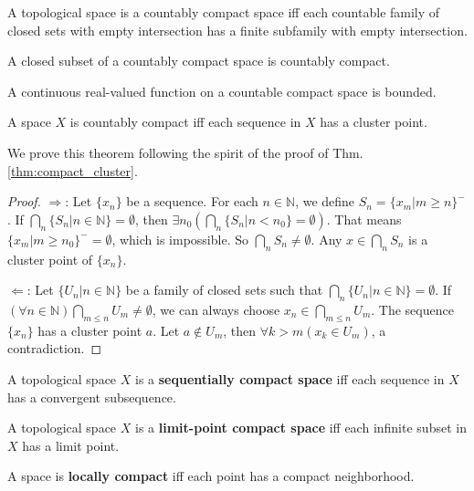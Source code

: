 \documentclass[12pt]{book}
\begin{document}
\begin{lemma}
	A topological space is a countably compact space iff each countable family of closed sets with empty intersection has a finite subfamily with empty intersection. 
\end{lemma}

\begin{theorem}
	A closed subset of a countably compact space is countably compact.
\end{theorem}

\begin{theorem}
	A continuous real-valued function on a countable compact space is bounded.
\end{theorem}

\begin{theorem}
	A space $X$ is countably compact iff each sequence in $X$ has a cluster point.
\end{theorem}
We prove this theorem following the spirit of the proof of Thm. \ref{thm:compact_cluster}.
\begin{proof}
	$\Rightarrow$: Let $\{x_n\}$ be a sequence. For each $n\in\mathbb N$, we define $S_n=\{x_m|m\geq n\}^-$. If $\bigcap_n\{S_n|n\in\mathbb N\}=\emptyset$, then $\exists n_0(\bigcap_n\{S_n|n<n_0\}=\emptyset)$. That means $\{x_m|m\geq n_0\}^-=\emptyset$, which is impossible. So $\bigcap_n S_n\neq \emptyset$. Any $x\in \bigcap_n S_n$ is a cluster point of $\{x_n\}$.
	
	$\Leftarrow$: Let $\{U_n|n\in \mathbb N\}$ be a family of closed sets such that  $\bigcap_n\{U_n|n\in\mathbb N\}=\emptyset$. If $(\forall n\in\mathbb N) \bigcap_{m\leq n}U_m\neq\emptyset$, we can always choose $x_n\in \bigcap_{m\leq n}U_m$. The sequence $\{x_n\}$ has a cluster point $a$. Let $a\not\in U_m$, then $\forall k>m(x_k\in U_m)$, a contradiction.
\end{proof}

\begin{definition}
	A topological space $X$ is a {\bf sequentially compact space} iff each sequence in $X$ has a convergent subsequence.
\end{definition}

\begin{definition}
	A topological space $X$ is a {\bf limit-point compact space} iff each infinite subset in $X$ has a limit point.
\end{definition}

\begin{definition}
	A space is {\bf locally compact} iff each point has a compact neighborhood.
\end{definition}
\end{document}
